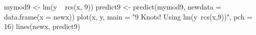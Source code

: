 \begin{Schunk}
\begin{Sinput}
 mymod9 <- lm(y ~ rcs(x, 9))
 predict9 <- predict(mymod9, newdata = data.frame(x = newx))
 plot(x, y, main = "9 Knots! Using lm(y~rcs(x,9))", pch = 16)
 lines(newx, predict9)
\end{Sinput}
\end{Schunk}
